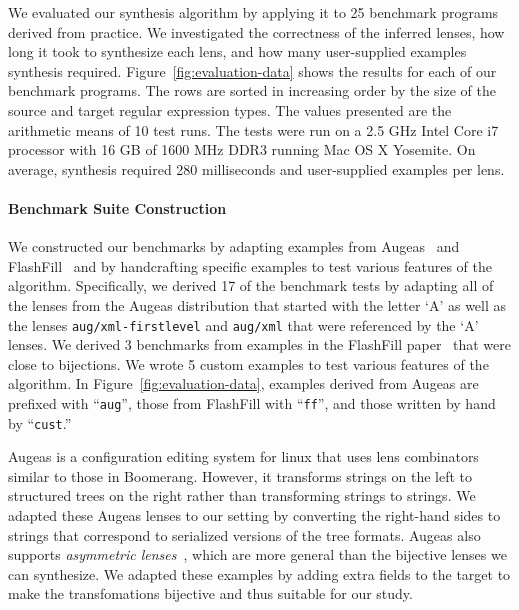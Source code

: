 \documentclass[numbers,10pt,preprint\ifanon ,nocopyrightspace\fi]{sigplanconf}
\begin{document}
We evaluated our synthesis algorithm by applying it to 25
benchmark programs derived from practice.  We investigated the
correctness of the inferred lenses, how long it took to synthesize
each lens, and how many user-supplied examples synthesis required.
Figure~\ref{fig:evaluation-data} shows the results for each of our
benchmark programs.  The rows are sorted in increasing order by the
size of the source and target regular expression types.  The values
presented are the arithmetic means of 10 test runs.  The tests were
run on a 2.5 GHz Intel Core i7 processor with 16 GB of 1600 MHz DDR3
running Mac OS X Yosemite.  On average, synthesis required 280 milliseconds
and  user-supplied examples per lens.

\paragraph*{Benchmark Suite Construction}
We constructed our benchmarks by adapting examples from
Augeas~\cite{augeas} and 
FlashFill~\cite{gulwani-popl-2014} and by handcrafting specific
examples to test various 
features of the algorithm.
Specifically, we derived 17 of the benchmark tests by
adapting all of the lenses from the Augeas distribution that started
with the letter `A' as well as the lenses
\texttt{aug/xml-firstlevel} and \texttt{aug/xml} that were referenced
by the `A' lenses.  We derived 3 benchmarks from examples in the
FlashFill paper~\cite{gulwani-popl-2014} that were close to bijections.
We wrote 5 custom examples to test various features of the
algorithm.
In Figure~\ref{fig:evaluation-data}, examples derived from Augeas are
prefixed with ``\texttt{aug}'', those from FlashFill with
``\texttt{ff}'', and those 
written by hand by ``\texttt{cust}.''

Augeas is a configuration editing system for linux that uses lens
combinators similar to those in Boomerang. However, it transforms
strings on the left to structured trees on the right rather than
transforming strings to strings.
We adapted these Augeas lenses to our setting by converting the
right-hand sides to strings that correspond to serialized versions
of the tree formats.  
Augeas also supports {\em asymmetric lenses}~\cite{Focal2005-long},
which are more general than the bijective lenses we can synthesize.
We adapted these examples by adding extra fields to the
target to make the transfomations bijective and thus suitable
for our study.

\end{document}
